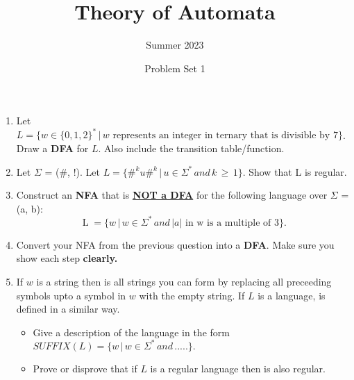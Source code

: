 \documentclass[11pt]{article}
\title{Theory of Automata}
\author{Summer 2023}
\date{Problem Set 1}
\newcommand{\op}[1]{\operatorname{#1}}
\begin{document}
\maketitle

\begin{enumerate}

\item Let $L = \{ w \in \{0,1, 2\}^* \, | \, w \textrm{ represents an integer in ternary that is divisible by } 7\}$. Draw a \textbf{DFA} for $L$. Also include the transition table/function.

\item  Let $\Sigma$ = (\#, !). Let $L = \bigl\{{\#^k}u{\#^k}\,|\,u\in\Sigma^{\ast}\,and\,k\,\ge\,1\bigr\}.$ Show that L is regular.

\item Construct an \textbf{NFA} that is \textbf{\underline{NOT a DFA}} for the following language over $\Sigma$ = (a, b):
    \[
    \op L = \bigl\{w\,|\,w\in\Sigma^{\ast}\,and\,
    \text{$|a|$ in w is a multiple of 3}\bigr\}.
    \]

\item Convert your NFA from the previous question into a \textbf{DFA}. Make sure you show each step \textbf{clearly.}

\item If $w$ is a string then  is all strings you can form by replacing all preceeding symbols upto a symbol in $w$ with the empty string. If $L$ is a language,  is defined in a similar way.
    \begin{itemize}
        \item Give a description of the language  in the form $SUFFIX(L) = \bigl\{w\,|\,w\in\Sigma^{\ast}\,and\,.....\bigr\}.$
        \item Prove or disprove that if $L$ is a regular language then  is also regular.
    \end{itemize}

\end{enumerate}
\end{document}
